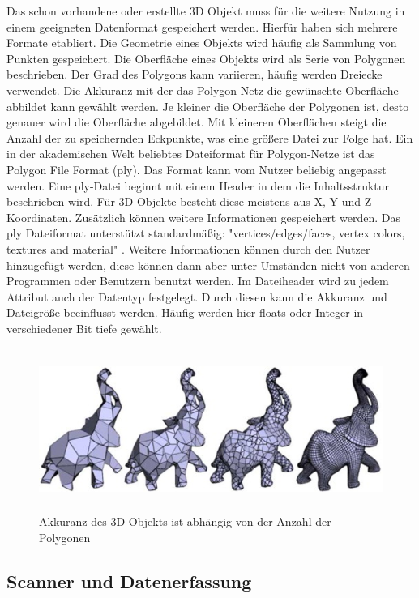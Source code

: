 Das schon vorhandene oder erstellte 3D Objekt muss für die weitere Nutzung
in einem geeigneten Datenformat gespeichert werden. Hierfür haben sich mehrere
Formate etabliert. Die Geometrie eines Objekts wird häufig als Sammlung von Punkten 
gespeichert. Die Oberfläche eines Objekts wird als Serie von Polygonen beschrieben. 
Der Grad des Polygons kann variieren, häufig werden Dreiecke verwendet. Die Akkuranz
mit der das Polygon-Netz die gewünschte Oberfläche abbildet kann gewählt werden. 
Je kleiner die Oberfläche der Polygonen ist, desto genauer wird die Oberfläche 
abgebildet. Mit kleineren Oberflächen steigt die Anzahl der zu speichernden 
Eckpunkte, was eine größere Datei zur Folge hat.
Ein in der akademischen Welt beliebtes Dateiformat für Polygon-Netze ist das 
Polygon File Format (ply).\cite{KentonMchenry.2008}
Das Format kann vom Nutzer beliebig angepasst werden. Eine ply-Datei beginnt mit 
einem Header in dem die Inhaltsstruktur beschrieben wird. 
Für 3D-Objekte besteht diese meistens aus X, Y und Z Koordinaten. 
Zusätzlich können weitere Informationen gespeichert werden. Das ply Dateiformat 
unterstützt standardmäßig: "vertices/edges/faces, vertex colors, textures and
material" \cite{KentonMchenry.2008}. Weitere Informationen können durch den Nutzer 
hinzugefügt werden, 
diese können dann aber unter Umständen nicht von anderen Programmen oder Benutzern
benutzt werden.
Im Dateiheader wird zu jedem Attribut auch der Datentyp festgelegt. Durch diesen 
kann die Akkuranz und Dateigröße beeinflusst werden. Häufig werden hier floats oder
Integer in verschiedener Bit tiefe gewählt.

\begin{figure}[h]
    \centering
    \includegraphics[height=150pt]{images/polgyonMeshes.jpg}
    \caption{Akkuranz des 3D Objekts ist abhängig von der Anzahl der Polygonen}
    \label{fig:meshes}
\end{figure}


\subsection{Scanner und Datenerfassung}

